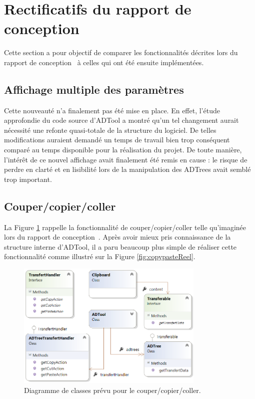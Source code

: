 \newpage
\section{Rectificatifs du rapport de conception}
\label{sec:rectConc}
    
    Cette section a pour objectif de comparer les fonctionnalités décrites lors du rapport de conception~\cite{conception} à celles qui ont été ensuite implémentées.

	\subsection{Affichage multiple des paramètres}

    Cette nouveauté n'a finalement pas été mise en place. En effet, l'étude approfondie du code source d'ADTool a montré qu'un tel changement aurait nécessité une refonte quasi-totale de la structure du logiciel. De telles modifications auraient demandé un temps de travail bien trop conséquent comparé au temps disponible pour la réalisation du projet. De toute manière, l'intérêt de ce nouvel affichage avait finalement été remis en cause : le risque de perdre en clarté et en lisibilité lors de la manipulation des ADTrees avait semblé trop important.

	\subsection{Couper/copier/coller}

	La {\sc Figure} \ref{fig:copypastePrevu} rappelle la fonctionnalité de couper/copier/coller telle qu'imaginée lors du rapport de conception~\cite{conception}. Après avoir mieux pris connaissance de la structure interne d'ADTool, il a paru beaucoup plus simple de réaliser cette fonctionnalité comme illustré sur la {\sc Figure} \ref{fig:copypasteReel}.
	
	
		\begin{figure}[H]
            \centering
                \includegraphics[width=0.8\textwidth]{figure/copiercoller.png}
            \caption{Diagramme de classes prévu pour le couper/copier/coller.}
            \label{fig:copypastePrevu}
        \end{figure}
        
